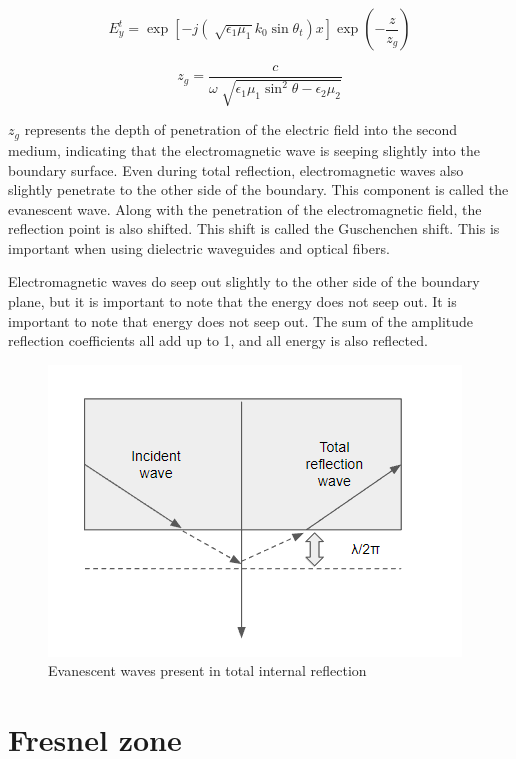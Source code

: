 \documentclass[a4paper,12pt]{report}
\begin{document}
\begin{equation}
  E^t_y = \exp[-j(\sqrt[]{\epsilon_1\mu_1}k_0\sin\theta_t)x]\exp\left(-\frac{z}{z_g}\right)
\end{equation}

\begin{equation}
  z_g = \frac{c}{\omega\sqrt[]{\epsilon_1\mu_1\sin^{2}\theta - \epsilon_2\mu_2}}
\end{equation}

$z_g$ represents the depth of penetration of the electric field into the second medium,
indicating that the electromagnetic wave is seeping slightly into the boundary surface.
Even during total reflection, 
electromagnetic waves also slightly penetrate to the other side of the boundary.
This component is called the evanescent wave.
Along with the penetration of the electromagnetic field,
the reflection point is also shifted.
This shift is called the Guschenchen shift.
This is important when using dielectric waveguides and optical fibers.


Electromagnetic waves do seep out slightly
to the other side of the boundary plane,
but it is important to note that the energy does not seep out.
It is important to note that energy does not seep out.
The sum of the amplitude reflection coefficients all add up to 1,
and all energy is also reflected.

\begin{figure}
  \begin{center}
    \includegraphics[clip, keepaspectratio, width=0.5\linewidth]{img/insertion_reflection_evanescence.png}
    \caption{Evanescent waves present in total internal reflection}
    \label{fig:insertion_reflection_evanescent}
  \end{center}
\end{figure}

\section{Fresnel zone}
\end{document}
